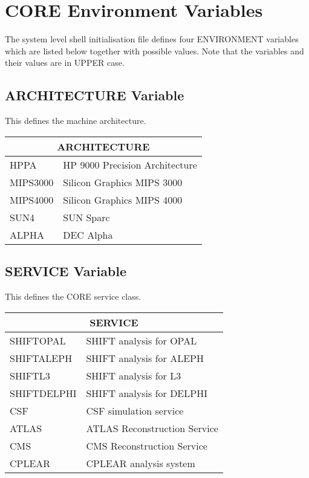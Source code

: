 \section {CORE Environment Variables}
 
The system level shell initialisation file defines four ENVIRONMENT
variables which are listed below together with possible values.
Note that the variables and their values are in UPPER case.
 
\subsection {ARCHITECTURE Variable}
 
This defines the machine architecture.
 
\begin{center}
\begin{tabular}{ll}
\multicolumn{2}{c}{ARCHITECTURE} \\
\hline
HPPA       &HP 9000 Precision Architecture \\
MIPS3000   &Silicon Graphics MIPS 3000     \\
MIPS4000   &Silicon Graphics MIPS 4000     \\
SUN4       &SUN Sparc                      \\
ALPHA      &DEC Alpha                      \\
\end{tabular}
\end{center}
 
\subsection {SERVICE Variable}
 
This defines the CORE service class.
 
\begin{center}
\begin{tabular}{ll}
\multicolumn{2}{c}{SERVICE} \\
\hline
SHIFTOPAL    & SHIFT analysis for OPAL                       \\
SHIFTALEPH   & SHIFT analysis for ALEPH                      \\
SHIFTL3      & SHIFT analysis for L3                         \\
SHIFTDELPHI  & SHIFT analysis for DELPHI                     \\
CSF          & CSF simulation service                        \\
ATLAS        & ATLAS Reconstruction Service                  \\
CMS          & CMS Reconstruction Service                    \\
CPLEAR       & CPLEAR analysis system                        \\
\end{tabular}
\end{center}
 
